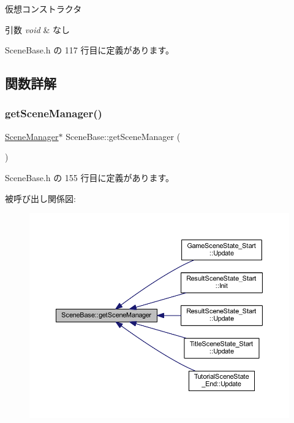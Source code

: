 仮想コンストラクタ 


\begin{DoxyParams}{引数}
{\em void} & なし \\
\hline
\end{DoxyParams}


 Scene\+Base.\+h の 117 行目に定義があります。



\subsection{関数詳解}
\mbox{\label{class_scene_base_aca9fd7fe190d13bcd4f5e3a832fb99c6}} 
\subsubsection{\texorpdfstring{get\+Scene\+Manager()}{getSceneManager()}}
{\footnotesize\ttfamily \mbox{\hyperlink{class_scene_manager}{Scene\+Manager}}$\ast$ Scene\+Base\+::get\+Scene\+Manager (\begin{DoxyParamCaption}{ }\end{DoxyParamCaption})\hspace{0.3cm}{\ttfamily [inline]}}



 Scene\+Base.\+h の 155 行目に定義があります。

被呼び出し関係図\+:
\nopagebreak
\begin{figure}[H]
\begin{center}
\leavevmode
\includegraphics[width=350pt]{class_scene_base_aca9fd7fe190d13bcd4f5e3a832fb99c6_icgraph}
\end{center}
\end{figure}
\mbox{\label{class_scene_base_a3ff1961cc340dcfb8fa1e9ae14b269eb}} 
